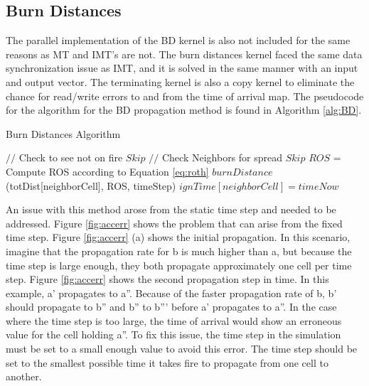 \subsection{Burn Distances}
The parallel implementation of the BD kernel is also not included for the same reasons as MT and IMT's are not. The burn distances kernel faced the same data synchronization issue as IMT, and it is solved in the same manner with an input and output vector. The terminating kernel is also a copy kernel to eliminate the chance for read/write errors to and from the time of arrival map. The pseudocode for the algorithm for the BD propagation method is found in Algorithm \ref{alg:BD}.

\begin{algorithm}[H]
  \caption{Burn Distances Algorithm}
  \label{alg:BD}
  \begin{algorithmic}
  \STATE $//$ Check to see not on fire
  \STATE $Skip$
  \ENDIF
  \STATE $//$ Check Neighbors for spread
  \STATE $Skip$
  \ENDIF
  \STATE $ROS$ = Compute ROS according to Equation \ref{eq:roth}
  \STATE $burnDistance$(totDist[neighborCell], ROS, timeStep)
  \STATE $ignTime[neighborCell] = timeNow$
  \ENDIF
  \ENDFOR
  \ENDFOR
  \end{algorithmic}
\end{algorithm}

An issue with this method arose from the static time step and needed to be addressed. Figure \ref{fig:accerr} shows the problem that can arise from the fixed time step. Figure \ref{fig:accerr} (a) shows the initial propagation. In this scenario, imagine that the propagation rate for b is much higher than a, but because the time step is large enough, they both propagate approximately one cell per time step. Figure \ref{fig:accerr} shows the second propagation step in time. In this example, a' propagates to a''. Because of the faster propagation rate of b, b' should propagate to b'' and b'' to b''' before a' propagates to a''. In the case where the time step is too large, the time of arrival would show an erroneous value for the cell holding a''. To fix this issue, the time step in the simulation must be set to a small enough value to avoid this error. The time step should be set to the smallest possible time it takes fire to propagate from one cell to another. 

